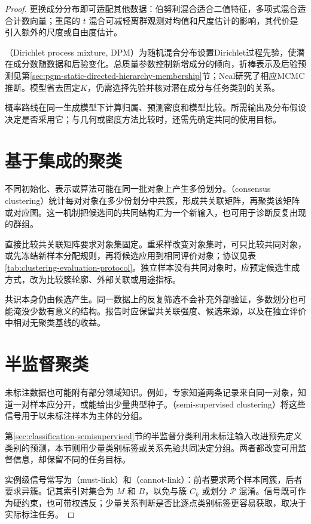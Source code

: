 \begin{proof}
更换成分分布即可适配其他数据：伯努利混合适合二值特征，多项式混合适合计数向量；重尾的 $t$ 混合可减轻离群观测对均值和尺度估计的影响，其代价是引入额外的尺度或自由度估计。

（Dirichlet process mixture, DPM）为随机混合分布设置Dirichlet过程先验，使潜在成分数随数据和后验变化。总质量参数控制新增成分的倾向，折棒表示及后验预测见第\ref{sec:pgm-static-directed-hierarchy-membership}节；Neal研究了相应MCMC推断。模型省去固定$K$，仍需选择先验并核对潜在成分与任务类别的关系。

概率路线在同一生成模型下计算归属、预测密度和模型比较。所需输出及分布假设决定是否采用它；与几何或密度方法比较时，还需先确定共同的使用目标。

\section{基于集成的聚类}
\label{sec:clustering-ensemble}

不同初始化、表示或算法可能在同一批对象上产生多份划分。（consensus clustering）统计每对对象在多少份划分中共簇，形成共关联矩阵，再聚类该矩阵或对应图。这一机制把候选间的共同结构汇为一个新输入，也可用于诊断反复出现的群组。

直接比较共关联矩阵要求对象集固定。重采样改变对象集时，可只比较共同对象，或先冻结新样本分配规则，再将候选应用到相同评价对象；协议见表\ref{tab:clustering-evaluation-protocol}。独立样本没有共同对象时，应预定候选生成方式，改为比较簇轮廓、外部关联或用途指标。

共识本身仍由候选产生。同一数据上的反复筛选不会补充外部验证，多数划分也可能淹没少数有意义的结构。报告时应保留共关联强度、候选来源，以及在独立评价中相对无聚类基线的收益。

\section{半监督聚类}
\label{sec:clustering-semisupervised}

未标注数据也可能附有部分领域知识。例如，专家知道两条记录来自同一对象，知道一对样本应分开，或能给出少量典型种子。（semi-supervised clustering）将这些信号用于以未标注样本为主体的分组。

第\ref{sec:classification-semisupervised}节的半监督分类利用未标注输入改进预先定义类别的预测，本节则用少量类别标签或关系先验共同决定分组。两者都改变可用监督信息，却保留不同的任务目标。

实例级信号常写为（must-link）和（cannot-link）：前者要求两个样本同簇，后者要求异簇。记其索引对集合为 $M$ 和 $B$，以免与簇 $C_k$ 或划分 $\mathcal{P}$ 混淆。信号既可作为硬约束，也可带权违反；少量关系判断是否比逐点类别标签更容易获取，取决于实际标注任务。


\end{proof}
